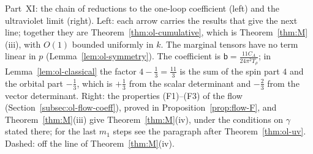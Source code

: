 \begin{gfigure}[tp]
\caption{Part~XI: the chain of reductions to the one-loop coefficient (left) and the ultraviolet limit (right). Left: each arrow carries the results that give the next line; together they are Theorem~\ref{thm:ol-cumulative}, which is Theorem~\ref{thm:M}(iii), with $O(1)$ bounded uniformly in $k$. The marginal tensors have no term linear in $p$ (Lemma~\ref{lem:ol-symmetry}). The coefficient is $\mathsf b=\frac{11C_A}{24\pi^2T_\rho}$; in Lemma~\ref{lem:ol-classical} the factor $4-\frac13=\frac{11}3$ is the sum of the spin part $4$ and the orbital part $-\frac13$, which is $+\frac13$ from the scalar determinant and $-\frac23$ from the vector determinant. Right: the properties (F1)--(F3) of the flow (Section~\ref{subsec:ol-flow-coeff}), proved in Proposition~\ref{prop:flow-F}, and Theorem~\ref{thm:M}(iii) give Theorem~\ref{thm:M}(iv), under the conditions on $\gamma$ stated there; for the last $m_1$ steps see the paragraph after Theorem~\ref{thm:ol-uv}. Dashed: off the line of Theorem~\ref{thm:M}(iv).}
\label{fig:G-partXI}
\end{gfigure}
